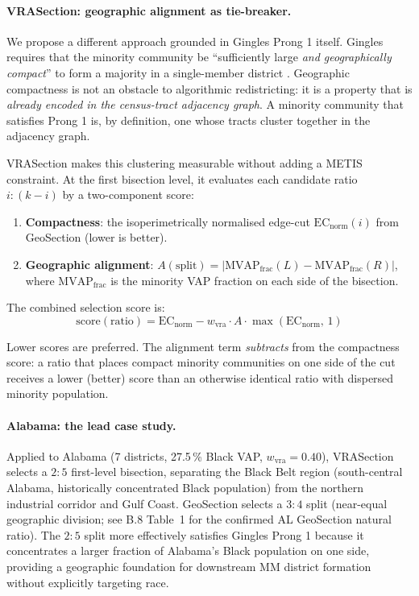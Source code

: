 \paragraph{VRASection: geographic alignment as tie-breaker.}
We propose a different approach grounded in Gingles Prong 1 itself.
Gingles requires that the minority community be ``sufficiently large
\emph{and geographically compact}'' to form a majority in a single-member
district \citep{gingles1986}.
Geographic compactness is not an obstacle to algorithmic redistricting:
it is a property that is \emph{already encoded in the census-tract adjacency
graph}.
A minority community that satisfies Prong 1 is, by definition, one whose
tracts cluster together in the adjacency graph.

VRASection makes this clustering measurable without adding a METIS constraint.
At the first bisection level, it evaluates each candidate ratio $i:(k-i)$
by a two-component score:

\begin{enumerate}
\item \textbf{Compactness}: the isoperimetrically normalised edge-cut
  $\mathrm{EC}_\text{norm}(i)$ from GeoSection \citep{b8paper} (lower is better).
\item \textbf{Geographic alignment}: $A(\text{split}) = |\mathrm{MVAP}_\text{frac}(L)
  - \mathrm{MVAP}_\text{frac}(R)|$, where $\mathrm{MVAP}_\text{frac}$ is the
  minority VAP fraction on each side of the bisection.
\end{enumerate}

The combined selection score is:
\[
  \text{score}(\text{ratio}) = \mathrm{EC}_{\text{norm}}
  - w_\text{vra} \cdot A \cdot \max(\mathrm{EC}_{\text{norm}},\, 1)
\]

Lower scores are preferred.
The alignment term \emph{subtracts} from the compactness score: a ratio
that places compact minority communities on one side of the cut receives
a lower (better) score than an otherwise identical ratio with dispersed
minority population.

\paragraph{Alabama: the lead case study.}
Applied to Alabama (7 districts, 27.5\,\% Black VAP, $w_\text{vra} = 0.40$),
VRASection selects a $2:5$ first-level bisection, separating the Black Belt
region (south-central Alabama, historically concentrated Black population)
from the northern industrial corridor and Gulf Coast.
GeoSection selects a $3:4$ split (near-equal geographic division; see B.8 Table~1 for the confirmed AL GeoSection natural ratio).
The $2:5$ split more effectively satisfies Gingles Prong 1 because it
concentrates a larger fraction of Alabama's Black population on one side,
providing a geographic foundation for downstream MM district formation
without explicitly targeting race.

